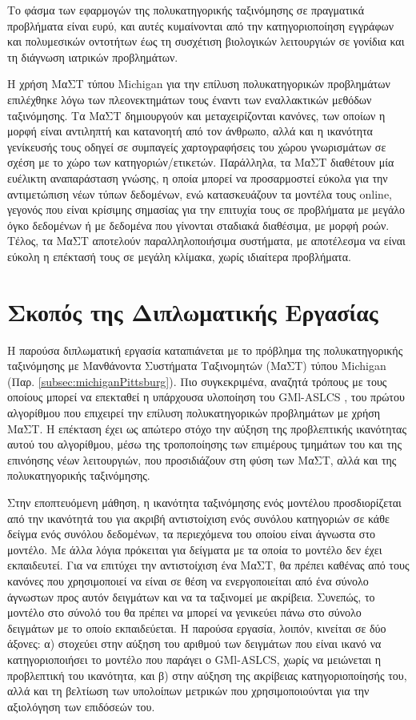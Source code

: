 Το φάσμα των εφαρμογών της πολυκατηγορικής ταξινόμησης σε πραγματικά προβλήματα είναι ευρύ, και αυτές κυμαίνονται από την κατηγοριοποίηση εγγράφων και πολυμεσικών οντοτήτων έως τη συσχέτιση βιολογικών λειτουργιών σε γονίδια και τη διάγνωση ιατρικών προβλημάτων.

Η χρήση ΜαΣΤ τύπου Michigan για την επίλυση πολυκατηγορικών προβλημάτων επιλέχθηκε λόγω των πλεονεκτημάτων τους έναντι των εναλλακτικών μεθόδων ταξινόμησης. Τα ΜαΣΤ δημιουργούν και μεταχειρίζονται κανόνες, των οποίων η μορφή είναι αντιληπτή και κατανοητή από τον άνθρωπο, αλλά και η ικανότητα γενίκευσής τους οδηγεί σε συμπαγείς χαρτογραφήσεις του χώρου γνωρισμάτων σε σχέση με το χώρο των κατηγοριών/ετικετών. Παράλληλα, τα ΜαΣΤ διαθέτουν μία ευέλικτη αναπαράσταση γνώσης, η οποία μπορεί να προσαρμοστεί εύκολα για την αντιμετώπιση νέων τύπων δεδομένων, ενώ κατασκευάζουν τα μοντέλα τους online, γεγονός που είναι κρίσιμης σημασίας για την επιτυχία τους σε προβλήματα με μεγάλο όγκο δεδομένων ή με δεδομένα που γίνονται σταδιακά διαθέσιμα, με μορφή ροών. Τέλος, τα ΜαΣΤ αποτελούν παραλληλοποιήσιμα συστήματα, με αποτέλεσμα να είναι εύκολη η επέκτασή τους σε μεγάλη κλίμακα, χωρίς ιδιαίτερα προβλήματα.


\section{Σκοπός της Διπλωματικής Εργασίας}
Η παρούσα διπλωματική εργασία καταπιάνεται με το πρόβλημα της πολυκατηγορικής ταξινόμησης με Μανθάνοντα Συστήματα Ταξινομητών (ΜαΣΤ) τύπου Michigan (Παρ. \ref{subsec:michiganPittsburg}). Πιο συγκεκριμένα, αναζητά τρόπους με τους οποίους μπορεί να επεκταθεί η υπάρχουσα υλοποίηση του GMl-ASLCS \cite{allamanis11}, του πρώτου αλγορίθμου που επιχειρεί την επίλυση πολυκατηγορικών προβλημάτων με χρήση ΜαΣΤ. Η επέκταση έχει ως απώτερο στόχο την αύξηση της προβλεπτικής ικανότητας αυτού του αλγορίθμου, μέσω της τροποποίησης των επιμέρους τμημάτων του και της επινόησης νέων λειτουργιών, που προσιδιάζουν στη φύση των ΜαΣΤ, αλλά και της πολυκατηγορικής ταξινόμησης. 

Στην εποπτευόμενη μάθηση, η ικανότητα ταξινόμησης ενός μοντέλου προσδιορίζεται από την ικανότητά του για ακριβή αντιστοίχιση ενός συνόλου κατηγοριών σε κάθε δείγμα ενός συνόλου δεδομένων, τα περιεχόμενα του οποίου είναι άγνωστα στο μοντέλο. Με άλλα λόγια πρόκειται για δείγματα με τα οποία το μοντέλο δεν έχει εκπαιδευτεί. Για να επιτύχει την αντιστοίχιση ένα ΜαΣΤ, θα πρέπει καθένας από τους κανόνες που χρησιμοποιεί να είναι σε θέση να ενεργοποιείται από ένα σύνολο άγνωστων προς αυτόν δειγμάτων και να τα ταξινομεί με ακρίβεια. Συνεπώς, το μοντέλο στο σύνολό του θα πρέπει να μπορεί να γενικεύει πάνω στο σύνολο δειγμάτων με το οποίο εκπαιδεύεται. Η παρούσα εργασία, λοιπόν, κινείται σε δύο άξονες: α) στοχεύει στην αύξηση του αριθμού των δειγμάτων που είναι ικανό να κατηγοριοποιήσει το μοντέλο που παράγει ο GMl-ASLCS, χωρίς να μειώνεται η προβλεπτική του ικανότητα, και β) στην αύξηση της ακρίβειας κατηγοριοποίησής του, αλλά και τη βελτίωση των υπολοίπων μετρικών που χρησιμοποιούνται για την αξιολόγηση των επιδόσεών του.



